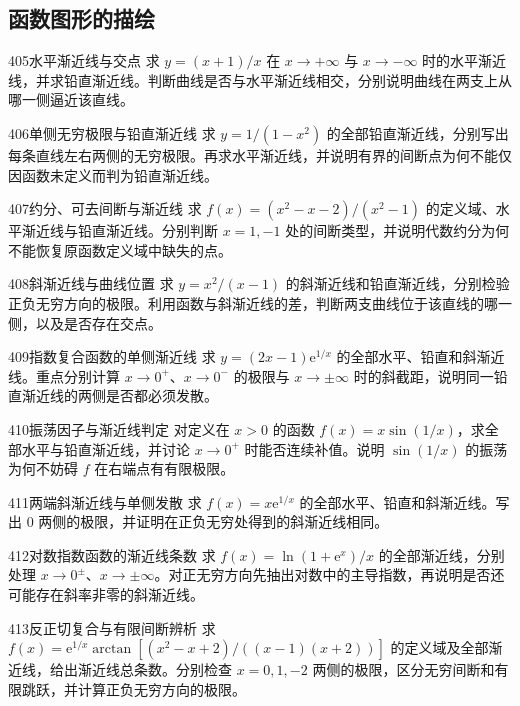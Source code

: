 \subsection{函数图形的描绘}
\begin{exercise}{405}{水平渐近线与交点}
求 $y=(x+1)/x$ 在 $x\to+\infty$ 与 $x\to-\infty$ 时的水平渐近线，并求铅直渐近线。判断曲线是否与水平渐近线相交，分别说明曲线在两支上从哪一侧逼近该直线。
\end{exercise}
\begin{exercise}{406}{单侧无穷极限与铅直渐近线}
求 $y=1/(1-x^2)$ 的全部铅直渐近线，分别写出每条直线左右两侧的无穷极限。再求水平渐近线，并说明有界的间断点为何不能仅因函数未定义而判为铅直渐近线。
\end{exercise}
\begin{exercise}{407}{约分、可去间断与渐近线}
求 $f(x)=(x^2-x-2)/(x^2-1)$ 的定义域、水平渐近线与铅直渐近线。分别判断 $x=1,-1$ 处的间断类型，并说明代数约分为何不能恢复原函数定义域中缺失的点。
\end{exercise}
\begin{exercise}{408}{斜渐近线与曲线位置}
求 $y=x^2/(x-1)$ 的斜渐近线和铅直渐近线，分别检验正负无穷方向的极限。利用函数与斜渐近线的差，判断两支曲线位于该直线的哪一侧，以及是否存在交点。
\end{exercise}
\begin{exercise}{409}{指数复合函数的单侧渐近线}
求 $y=(2x-1)\mathrm e^{1/x}$ 的全部水平、铅直和斜渐近线。重点分别计算 $x\to0^+$、$x\to0^-$ 的极限与 $x\to\pm\infty$ 时的斜截距，说明同一铅直渐近线的两侧是否都必须发散。
\end{exercise}
\begin{exercise}{410}{振荡因子与渐近线判定}
对定义在 $x>0$ 的函数 $f(x)=x\sin(1/x)$，求全部水平与铅直渐近线，并讨论 $x\to0^+$ 时能否连续补值。说明 $\sin(1/x)$ 的振荡为何不妨碍 $f$ 在右端点有有限极限。
\end{exercise}
\begin{exercise}{411}{两端斜渐近线与单侧发散}
求 $f(x)=x\mathrm e^{1/x}$ 的全部水平、铅直和斜渐近线。写出 $0$ 两侧的极限，并证明在正负无穷处得到的斜渐近线相同。
\end{exercise}
\begin{exercise}{412}{对数指数函数的渐近线条数}
求 $f(x)=\ln(1+\mathrm e^x)/x$ 的全部渐近线，分别处理 $x\to0^\pm$、$x\to\pm\infty$。对正无穷方向先抽出对数中的主导指数，再说明是否还可能存在斜率非零的斜渐近线。
\end{exercise}
\begin{exercise}{413}{反正切复合与有限间断辨析}
求 $f(x)=\mathrm e^{1/x}\arctan[(x^2-x+2)/((x-1)(x+2))]$ 的定义域及全部渐近线，给出渐近线总条数。分别检查 $x=0,1,-2$ 两侧的极限，区分无穷间断和有限跳跃，并计算正负无穷方向的极限。
\end{exercise}
